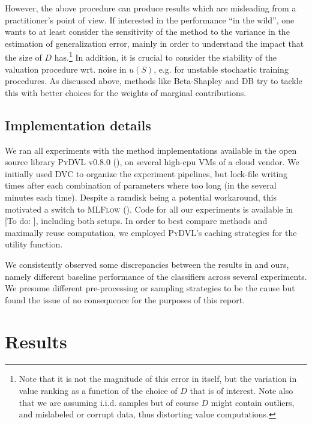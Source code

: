 \documentclass[10pt]{article}
\newcommand{\tmname}[1]{\textsc{#1}}
\newcommand{\todo}[1]{{\color{red!75!black}[To do: #1]}}
\begin{document}
However, the above procedure can produce results which are misleading from a
practitioner's point of view. If interested in the performance ``in the
wild'', one wants to at least consider the sensitivity of the method to the
variance in the estimation of generalization error, mainly in order to
understand the impact that the size of $D$ has.\footnote{Note that it is not
the magnitude of this error in itself, but the variation in value ranking as a
function of the choice of $D$ that is of interest. Note also that we are
assuming i.i.d. samples but of course $D$ might contain outliers, and
mislabeled or corrupt data, thus distorting value computations.} In addition,
it is crucial to consider the stability of the valuation procedure wrt. noise
in $u (S)$, e.g. for unstable stochastic training procedures. As discussed
above, methods like Beta-Shapley and DB try to tackle this with better choices
for the weights of marginal contributions.

\subsection{Implementation details}

We ran all experiments with the method implementations available in the open
source library {\tmname{PyDVL}} v0.8.0 ({\cite{transferlab_pydvl_2022}}), on
several high-cpu VMs of a cloud vendor. We initially used {\tmname{DVC}} to
organize the experiment pipelines, but lock-file writing times after each
combination of parameters where too long (in the several minutes each time).
Despite a ramdisk being a potential workaround, this motivated a switch to
{\tmname{MLFlow}} ({\cite{wilson_mlflow_2023}}). Code for all our experiments
is available in {\todo{}}, including both setups. In order to best compare
methods and maximally reuse computation, we employed {\tmname{PyDVL}}'s
caching strategies for the utility function.

We consistently observed some discrepancies between the results in
{\cite{schoch_csshapley_2022}} and ours, namely different baseline
performance of the classifiers across several experiments. We presume
different pre-processing or sampling strategies to be the cause but found the
issue of no consequence for the purposes of this report.

\section{Results}\label{sec:results}
\end{document}
